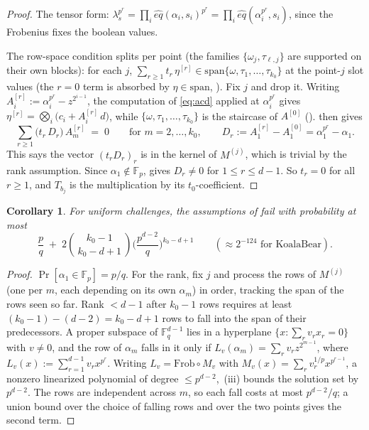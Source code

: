 \documentclass{article}
\newcommand{\Fp}{\mathbb{F}_p}
\newcommand{\Fq}{\mathbb{F}_q}
\newcommand{\extdeg}{d}
\newtheorem{corollary}[theorem]{Corollary}
\theoremstyle{definition}
\begin{document}
\begin{proof}
The tensor form: $\lambda_s^{p^r} = \prod_i \hat{eq}(\alpha_i, s_i)^{p^r} = \prod_i \hat{eq}(\alpha_i^{p^r}, s_i)$, since the Frobenius fixes the boolean values.

The row-space condition splits per point (the families $\{\omega_j, \tau_{\ell,j}\}$ are supported on their own blocks): for each $j$, $\sum_{r \geq 1} t_r\, \eta^{[r]} \in \mathrm{span}\{\omega, \tau_1, \dots, \tau_{k_0}\}$ at the point-$j$ slot values (the $r = 0$ term is absorbed by $\eta \in \mathrm{span}$, ). Fix $j$ and drop it. Writing $A^{[r]}_i := \alpha_i^{p^r} - z^{2^{i-1}}$, the computation of \cref{eq:acd} applied at $\alpha_i^{p^r}$ gives $\eta^{[r]} = \bigotimes_i \big(c_i + A^{[r]}_i\, d\big)$, while $\{\omega, \tau_1, \dots, \tau_{k_0}\}$ is the staircase of $A^{[0]}$ ().  then gives
\[
\sum_{r \geq 1} \big( t_r\, D_r \big)\, A^{[r]}_m \;=\; 0 \qquad \text{for } m = 2, \dots, k_0 , \qquad D_r := A^{[r]}_1 - A^{[0]}_1 = \alpha_1^{p^r} - \alpha_1 .
\]
This says the vector $(t_r D_r)_r$ is in the kernel of $M^{(j)}$, which is trivial by the rank assumption. Since $\alpha_1 \notin \Fp$,  gives $D_r \neq 0$ for $1 \leq r \leq \extdeg - 1$. So $t_r = 0$ for all $r \geq 1$, and $T_{b_j}$ is the multiplication by its $t_0$-coefficient.
\end{proof}

\begin{corollary}\label{cor:twistprob}
For uniform challenges, the assumptions of  fail with probability at most
\[
\frac{p}{q} \;+\; 2 \binom{k_0 - 1}{\,k_0 - \extdeg + 1\,} \Big( \frac{p^{\extdeg - 2}}{q} \Big)^{k_0 - \extdeg + 1}
\qquad (\approx 2^{-124} \text{ for KoalaBear}) .
\]
\end{corollary}

\begin{proof}
$\Pr[\alpha_1 \in \Fp] = p/q$. For the rank, fix $j$ and process the rows of $M^{(j)}$ (one per $m$, each depending on its own $\alpha_m$) in order, tracking the span of the rows seen so far. Rank $< \extdeg - 1$ after $k_0 - 1$ rows requires at least $(k_0 - 1) - (\extdeg - 2) = k_0 - \extdeg + 1$ rows to fall into the span of their predecessors. A proper subspace of $\Fq^{\extdeg - 1}$ lies in a hyperplane $\{x : \sum_r v_r x_r = 0\}$ with $v \neq 0$, and the row of $\alpha_m$ falls in it only if $L_v(\alpha_m) = \sum_r v_r z^{2^{m-1}}$, where $L_v(x) := \sum_{r=1}^{\extdeg-1} v_r x^{p^r}$. Writing $L_v = \mathrm{Frob} \circ M_v$ with $M_v(x) = \sum_r v_r^{1/p} x^{p^{r-1}}$, a nonzero linearized polynomial of degree $\leq p^{\extdeg - 2}$, \,(iii) bounds the solution set by $p^{\extdeg - 2}$. The rows are independent across $m$, so each fall costs at most $p^{\extdeg-2}/q$; a union bound over the choice of falling rows and over the two points gives the second term.
\end{proof}
\end{document}
